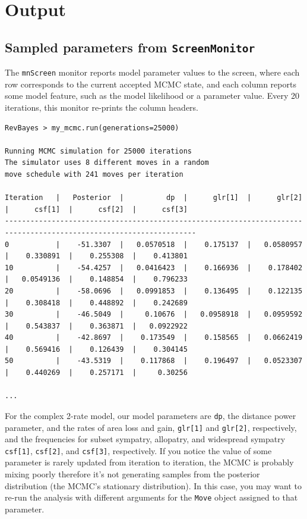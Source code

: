 \section{Output}

\subsection{Sampled parameters from {\tt ScreenMonitor}}

The {\tt mnScreen} monitor reports model parameter values to the screen, where each row corresponds to the current accepted MCMC state, and each column reports some model feature, such as the model likelihood or a parameter value.
Every 20 iterations, this monitor re-prints the column headers.

\begin{snugshade}
\begin{lstlisting}
RevBayes > my_mcmc.run(generations=25000)

Running MCMC simulation for 25000 iterations
The simulator uses 8 different moves in a random
move schedule with 241 moves per iteration

Iteration   |   Posterior  |          dp  |      glr[1]  |      glr[2]  |      csf[1]  |      csf[2]  |      csf[3]
-------------------------------------------------------------------------------------------------------------------
0           |    -51.3307  |   0.0570518  |    0.175137  |   0.0580957  |    0.330891  |    0.255308  |    0.413801
10          |    -54.4257  |   0.0416423  |    0.166936  |    0.178402  |   0.0549136  |    0.148854  |    0.796233
20          |    -58.0696  |   0.0991853  |    0.136495  |    0.122135  |    0.308418  |    0.448892  |    0.242689
30          |    -46.5049  |     0.10676  |   0.0958918  |   0.0959592  |    0.543837  |    0.363871  |   0.0922922
40          |    -42.8697  |    0.173549  |    0.158565  |   0.0662419  |    0.569416  |    0.126439  |    0.304145
50          |    -43.5319  |    0.117868  |    0.196497  |   0.0523307  |    0.440269  |    0.257171  |     0.30256

...
\end{lstlisting}
\end{snugshade}

For the complex 2-rate model, our model parameters are {\tt dp}, the distance power parameter, and the rates of area loss and gain, {\tt glr[1]} and {\tt glr[2]}, respectively, and the frequencies for subset sympatry, allopatry, and widespread sympatry {\tt csf[1]}, {\tt csf[2]}, and {\tt csf[3]}, respectively. 
If you notice the value of some parameter is rarely updated from iteration to iteration, the MCMC is probably mixing poorly therefore it's not generating samples from the posterior distribution (the MCMC's stationary distribution).
In this case, you may want to re-run the analysis with different arguments for the {\tt Move} object assigned to that parameter.

